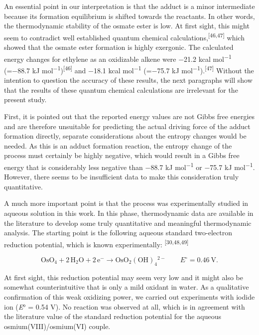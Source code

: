 \documentclass{article}
\begin{document}
An essential point in our interpretation is that the adduct  is a minor intermediate because its formation equilibrium is shifted towards the reactants. In other words, the thermodynamic stability of the osmate ester is low. At first sight, this might seem to contradict well established quantum chemical calculations,\textsuperscript{[46,47]} which showed that the osmate ester formation is highly exergonic. The calculated energy changes for ethylene as an oxidizable alkene were −21.2 kcal mol\textsuperscript{−1} (=−88.7 kJ mol\textsuperscript{−1})\textsuperscript{[46]} and −18.1 kcal mol\textsuperscript{−1} (=−75.7 kJ mol\textsuperscript{−1}).\textsuperscript{[47]} Without the intention to question the accuracy of these results, the next paragraphs will show that the results of these quantum chemical calculations are irrelevant for the present study.

First, it is pointed out that the reported energy values are not Gibbs free energies and are therefore unsuitable for predicting the actual driving force of the adduct formation directly, separate considerations about the entropy changes would be needed. As this is an adduct formation reaction, the entropy change of the process must certainly be highly negative, which would result in a Gibbs free energy that is considerably less negative than −88.7 kJ mol\textsuperscript{−1} or −75.7 kJ mol\textsuperscript{−1}. However, there seems to be insufficient data to make this consideration truly quantitative.

A much more important point is that the process was experimentally studied in aqueous solution in this work. In this phase, thermodynamic data are available in the literature to develop some truly quantitative and meaningful thermodynamic analysis. The starting point is the following aqueous standard two-electron reduction potential, which is known experimentally: \textsuperscript{[30,48,49]}

\begin{equation*}
\mathrm{OsO_4 + 2\,H_2O + 2\,e^- \rightarrow OsO_2(OH)_4{}^{2-}} \qquad E^\circ = 0.46\ \mathrm{V}.
\end{equation*}

At first sight, this reduction potential may seem very low and it might also be somewhat counterintuitive that  is only a mild oxidant in water. As a qualitative confirmation of this weak oxidizing power, we carried out experiments with iodide ion (\emph{E}° = 0.54 V). No reaction was observed at all, which is in agreement with the literature value of the standard reduction potential for the aqueous osmium(VIII)/osmium(VI) couple.
\end{document}
